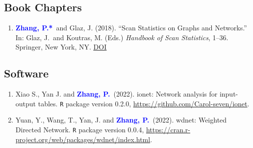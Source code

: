 \documentclass[12pt]{article}
\newcommand{\PZ}{\textcolor{blue}{\textbf{Zhang, P.*}}}
\newcommand{\PZnot}{\textcolor{blue}{\textbf{Zhang, P.}}}
\begin{document}
	\subsection*{Book Chapters}
	\begin{enumerate}
		\item \PZ\ and {\sc Glaz, J.} (2018). ``Scan 
		Statistics on Graphs and Networks.'' In: Glaz, J.\ and Koutras, M. (Eds.) {\em Handbook of Scan Statistics}, 1--36. Springer, New York, NY. 
		\href{https://doi.org/10.1007/978-1-4614-8414-1_43-1}
		{\underline{DOI}}	
	\end{enumerate}
	
	\subsection*{Software}
	\begin{enumerate}
		\item{\sc Xiao S., Yan J.} and \PZnot\ (2022).
		ionet: Network analysis for input-output tables. {\tt R} package version 0.2.0, \url{https://github.com/Carol-seven/ionet}.
		
		\item {\sc Yuan, Y., Wang, T., Yan, J.} and \PZnot\ (2022). 
		wdnet: Weighted Directed Network. {\tt R} package version 0.0.4, \url{https://cran.r-project.org/web/packages/wdnet/index.html}.
	\end{enumerate}
	
\end{document}
